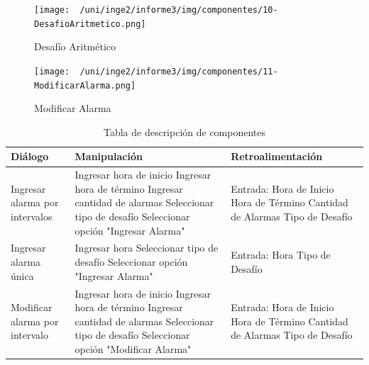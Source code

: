 \begin{figure}[H]
	\centering
	\texttt{[image: ~/uni/inge2/informe3/img/componentes/10-DesafioAritmetico.png]}
	\caption{Desafío Aritmético}
        \vspace{5pt}
	\label{fig:Desafío Aritmético}
\end{figure}

\begin{figure}[H]
	\centering
	\texttt{[image: ~/uni/inge2/informe3/img/componentes/11-ModificarAlarma.png]}
	\caption{Modificar Alarma}
        \vspace{5pt}
	\label{fig:Modificar Alarma}
\end{figure}

\begin{table}[H]
    \centering
    \caption{Tabla de descripción de componentes}
    \vspace{5pt}
\begin{tabular}{|p{4cm}|p{5cm}|p{5cm}|}
    \hline
    \textbf{Diálogo} & \textbf{Manipulación} & \textbf{Retroalimentación} \\ \hline
    Ingresar alarma por intervalos &
    Ingresar hora de inicio\newline
    Ingresar hora de término\newline
    Ingresar cantidad de alarmas\newline
    Seleccionar tipo de desafío\newline
    Seleccionar opción "Ingresar Alarma"
    &
    Entrada:\newline
    Hora de Inicio\newline
    Hora de Término\newline
    Cantidad de Alarmas\newline
    Tipo de Desafío\newline
\\ \hline
    Ingresar alarma única &
    Ingresar hora\newline
    Seleccionar tipo de desafío\newline
    Seleccionar opción "Ingresar Alarma"
    &
    Entrada:\newline
    Hora\newline
    Tipo de Desafío\newline
 \\ \hline
    Modificar alarma por intervalo &
    Ingresar hora de inicio\newline
    Ingresar hora de término\newline
    Ingresar cantidad de alarmas\newline
    Seleccionar tipo de desafío\newline
    Seleccionar opción "Modificar Alarma"
    &
    Entrada:\newline
    Hora de Inicio\newline
    Hora de Término\newline
    Cantidad de Alarmas\newline
    Tipo de Desafío\newline
    

\end{tabular}
\end{table}
